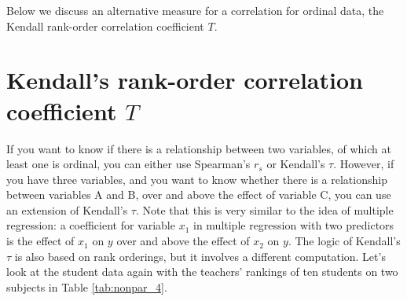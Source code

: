 Below we discuss an alternative measure for a correlation for ordinal data, the Kendall rank-order correlation coefficient $T$. 


\section{Kendall's rank-order correlation coefficient $T$}


If you want to know if there is a relationship between two variables, of which at least one is ordinal, you can either use Spearman's $r_s$ or Kendall's $\tau$. However, if you have three variables, and you want to know whether there is a relationship between variables A and B, over and above the effect of variable C, you can use an extension of Kendall's $\tau$. Note that this is very similar to the idea of multiple regression: a coefficient for variable $x_1$ in multiple regression with two predictors is the effect of $x_1$ on $y$ over and above the effect of $x_2$ on $y$. The logic of Kendall's $\tau$ is also based on rank orderings, but it involves a different computation. Let's look at the student data again with the teachers' rankings of ten students on two subjects in Table \ref{tab:nonpar_4}. 


\begin{kframe}


{\ttfamily\noindent\bfseries{}}\end{kframe}



